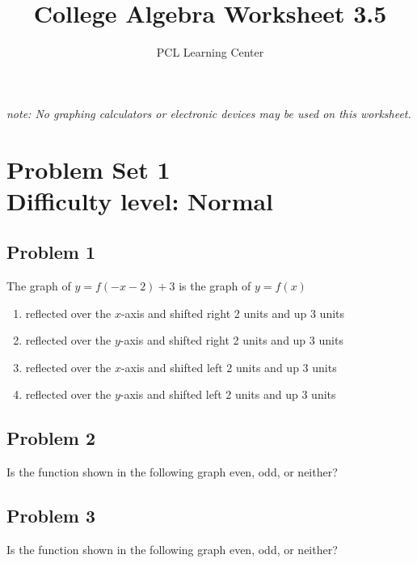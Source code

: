 \documentclass[12pt]{article}
\title{College Algebra Worksheet 3.5}
\author{PCL Learning Center}
\date{}
\begin{document}
\maketitle

\begin{center}
    \textit{note: No graphing calculators or electronic devices may be used on this worksheet.}    
\end{center}

\section*{Problem Set 1\\Difficulty level: Normal}
\subsection*{Problem 1}
The graph of \(y=f(-x-2)+3\) is the graph of \(y=f(x)\)
\begin{enumerate}[label=(\alph*)]
    \item reflected over the \( x \)-axis and shifted right 2 units and up 3 units
    \item reflected over the \( y \)-axis and shifted right 2 units and up 3 units
    \item reflected over the \( x \)-axis and shifted left 2 units and up 3 units
    \item reflected over the \( y \)-axis and shifted left 2 units and up 3 units
\end{enumerate}

\subsection*{Problem 2}
Is the function shown in the following graph even, odd, or neither?
    \begin{center}
    \end{center}

\subsection*{Problem 3}
Is the function shown in the following graph even, odd, or neither?
    \begin{center}
    \end{center}
\end{document}
